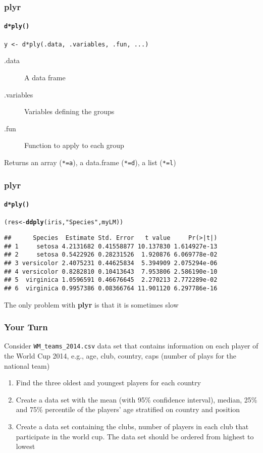\documentclass[paper=screen,mathserif]{beamer}\usepackage[]{graphicx}\usepackage[]{color}
\makeatletter
\newcommand{\hlstr}[1]{\textcolor[rgb]{0.192,0.494,0.8}{#1}}%
\newcommand{\hlstd}[1]{\textcolor[rgb]{0.345,0.345,0.345}{#1}}%
\newcommand{\hlkwb}[1]{\textcolor[rgb]{0.69,0.353,0.396}{#1}}%
\newcommand{\hlkwd}[1]{\textcolor[rgb]{0.737,0.353,0.396}{\textbf{#1}}}%
\newenvironment{kframe}{%
 \def\at@end@of@kframe{}%
 \ifinner\ifhmode%
  \def\at@end@of@kframe{\end{minipage}}%
  \begin{minipage}{\columnwidth}%
 \fi\fi%
 \def\FrameCommand##1{\hskip\@totalleftmargin \hskip-\fboxsep
 \colorbox{shadecolor}{##1}\hskip-\fboxsep
     \hskip-\linewidth \hskip-\@totalleftmargin \hskip\columnwidth}%
 \MakeFramed {\advance\hsize-\width
   \@totalleftmargin\z@ \linewidth\hsize
   \@setminipage}}%
 {\par\unskip\endMakeFramed%
 \at@end@of@kframe}
\newenvironment{knitrout}{}{} %
\newcommand{\ft}[1]{\frametitle{#1}}
\newcommand{\fst}[1]{\framesubtitle{#1}}
\makeatother
\begin{document}
\begin{frame}[fragile]
  \ft{{\bf plyr}}
  \fst{{\tt d*ply()}}
  
  \verb=y <- d*ply(.data, .variables, .fun, ...)=
  \vspace{0.5cm}
  \begin{description}
  \item[.data] A data frame
  \item[.variables] Variables defining the groups
  \item[.fun] Function to apply to each group
  \end{description}
  Returns an array (\verb|*=a|), a data.frame (\verb|*=d|), a list
  (\verb|*=l|)
  
\end{frame}

\begin{frame}[fragile]
  \ft{{\bf plyr}}
  \fst{{\tt d*ply()}}

\begin{knitrout}\scriptsize
{}\color{fgcolor}\begin{kframe}
\begin{alltt}
\hlstd{(res} \hlkwb{<-} \hlkwd{ddply}\hlstd{(iris,} \hlstr{"Species"}\hlstd{, myLM))}
\end{alltt}
\begin{verbatim}
##      Species  Estimate Std. Error   t value     Pr(>|t|)
## 1     setosa 4.2131682 0.41558877 10.137830 1.614927e-13
## 2     setosa 0.5422926 0.28231526  1.920876 6.069778e-02
## 3 versicolor 2.4075231 0.44625834  5.394909 2.075294e-06
## 4 versicolor 0.8282810 0.10413643  7.953806 2.586190e-10
## 5  virginica 1.0596591 0.46676645  2.270213 2.772289e-02
## 6  virginica 0.9957386 0.08366764 11.901120 6.297786e-16
\end{verbatim}
\end{kframe}
\end{knitrout}

\pause \vspace{0.5cm} 
The only problem with {\bf plyr} is that it
is sometimes slow
\end{frame}

\begin{frame}[fragile]
  \ft{Your Turn}
  
  Consider \verb=WM_teams_2014.csv= data set that contains information
  on each player of the World Cup 2014, e.g., age, club, country, caps
  (number of plays for the national team)
  \begin{enumerate}
  \item Find the three oldest and youngest players for each country
  \item Create a data set with the mean (with 95\% confidence
    interval), median, 25\% and 75\% percentile of the players' age
    stratified on country and position
  \item Create a data set containing the clubs, number of players in
    each club that participate in the world cup. The data set should
    be ordered from highest to lowest
  \end{enumerate}
\end{frame}
\end{document}
